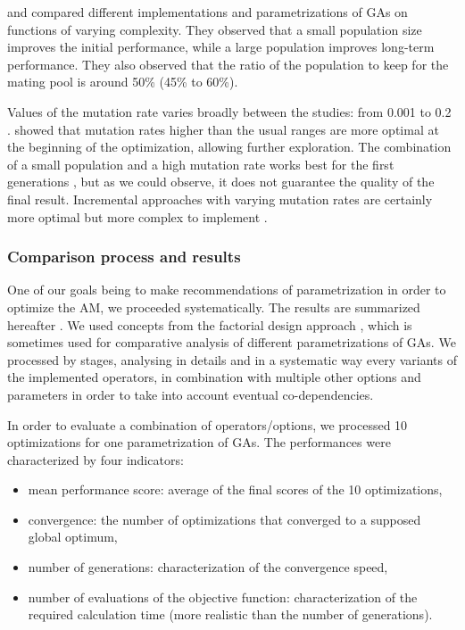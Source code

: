 \documentclass[twocol]{ametsoc}
\begin{document}
\citet{DeJong1975a} and \citet{Grefenstette1986} compared different implementations and parametrizations of GAs on functions of varying complexity. They observed that a small population size improves the initial performance, while a large population improves long-term performance. They also observed that the ratio of the population to keep for the mating pool is around 50\% (45\% to 60\%).

Values of the mutation rate varies broadly between the studies: from 0.001 \citep{DeJong1975a} to 0.2 \citep{Haupt2004}. \citet{Back1996b} showed that mutation rates higher than the usual ranges are more optimal at the beginning of the optimization, allowing further exploration. The combination of a small population and a high mutation rate works best for the first generations \citep{DeJong1975a, Back1996b, Haupt2004}, but as we could observe, it does not guarantee the quality of the final result. Incremental approaches with varying mutation rates are certainly more optimal but more complex to implement \citep{Back1996a, Back1996b}.


\subsubsection{Comparison process and results}

One of our goals being to make recommendations of parametrization in order to optimize the AM, we proceeded systematically. The results are summarized hereafter \citep[see][for the details]{Horton2012a}. We used concepts from the factorial design approach \citep[see eg.][]{Costa2005a,Costa2007a,Mariano2010a}, which is sometimes used for comparative analysis of different parametrizations of GAs. We processed by stages, analysing in details and in a systematic way every variants of the implemented operators, in combination with multiple other options and parameters in order to take into account eventual co-dependencies. 

In order to evaluate a combination of operators/options, we processed 10 optimizations for one parametrization of GAs. The performances were characterized by four indicators:

\begin{itemize}
	\item mean performance score: average of the final scores of the 10 optimizations,
	\item convergence: the number of optimizations that converged to a supposed global optimum,
	\item number of generations: characterization of the convergence speed,
	\item number of evaluations of the objective function: characterization of the required calculation time (more realistic than the number of generations).
\end{itemize}
\end{document}
